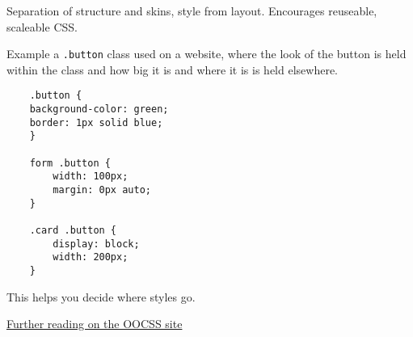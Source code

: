Separation of structure and skins, style from layout. Encourages reuseable, scaleable CSS.

Example a \texttt{.button} class used on a website, where the look of the button is held within the class and how big it is and where it is is held elsewhere.

\begin{verbatim}
    .button {
	background-color: green;
	border: 1px solid blue;
    }

    form .button {
        width: 100px;
        margin: 0px auto;
    }

    .card .button {
        display: block;
        width: 200px;
    }
\end{verbatim}

This helps you decide where styles go.

\href{http://oocss.org/}{Further reading on the OOCSS site}